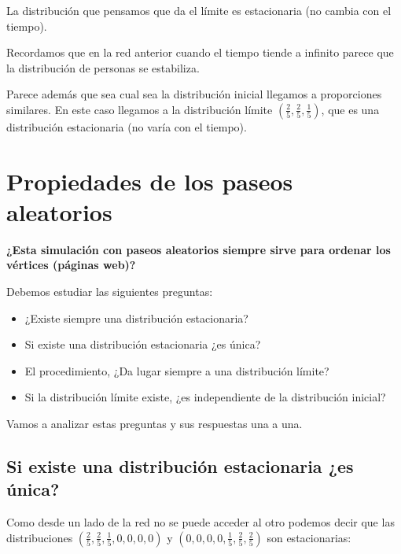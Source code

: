 	La distribución que pensamos que da el límite es estacionaria (no cambia con el tiempo).




Recordamos que en la red anterior cuando el tiempo tiende a infinito parece que la distribución de personas se estabiliza.


Parece además que sea cual sea la distribución inicial llegamos a proporciones similares. En este caso llegamos a la distribución límite $\left(\frac{2}{5},\frac{2}{5},\frac{1}{5}\right)$, que es una distribución estacionaria (no varía con el tiempo).

\section{Propiedades de los paseos aleatorios}

\textbf{¿Esta simulación con paseos aleatorios siempre sirve para ordenar los vértices (páginas web)?}

Debemos estudiar las siguientes preguntas:

\begin{itemize}
	\item ¿Existe siempre una distribución estacionaria?
	\item Si existe una distribución estacionaria ¿es única?
	\item El procedimiento, ¿Da lugar siempre a una distribución límite?
	\item Si la distribución límite existe, ¿es independiente de la distribución inicial?

\end{itemize}

Vamos a analizar estas preguntas y sus respuestas una a una.

\subsection{Si existe una distribución estacionaria ¿es única?}
\label{P2}

\begin{center}
	\centering
\end{center}

Como desde un lado de la red no se puede acceder al otro podemos decir que las  distribuciones $(\frac{2}{5},\frac{2}{5},\frac{1}{5}, 0, 0 , 0, 0)$ y $(0, 0, 0, 0, \frac{1}{5}, \frac{2}{5}, \frac{2}{5})$ son estacionarias:

